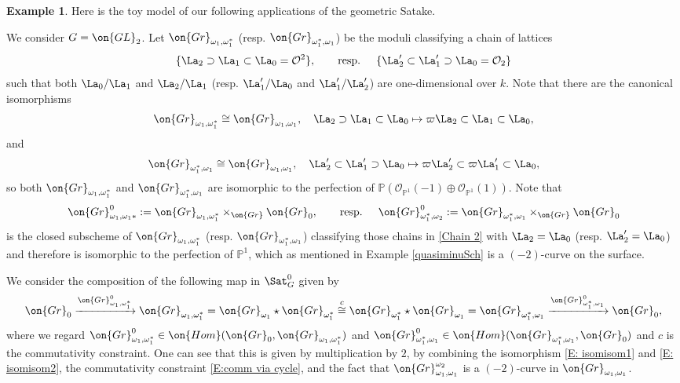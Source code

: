 \documentclass[11pt]{amsart}
\theoremstyle{definition}
\theoremstyle{definition}
\newtheorem{ex}[thm]{Example}
\theoremstyle{definition}
\numberwithin{equation}{subsection}
\newcommand{\bP}{{\mathbb P}}
\newcommand{\mO}{{\mathcal O}}
\newcommand{\Gr}{{\on{Gr}}}
\newcommand{\Hom}{{\on{Hom}}}
\newcommand{\GL}{{\on{GL}}}
\begin{document}
\begin{ex}\label{intersection by geom Sat}
Here is the toy model of our following applications of the geometric Satake. 

We consider $G=\GL_2$. Let $\Gr_{\omega_1,\omega_1^*}$ (resp. $\Gr_{\omega_1^*,\omega_1}$) be the moduli classifying a chain of lattices
\begin{equation}\label{Chain 2}
\{\La_2\supset\La_1\subset \La_0=\mO^2\}, \quad \quad \mbox{resp. } \quad \{\La'_2\subset \La'_1\supset \La_0=\mO_2\}
\end{equation}
such that both $\La_0/\La_{1}$ and $\La_2/\La_1$ (resp. $\La'_1/\La_0$ and $\La'_1/\La'_2$) are one-dimensional over $k$.
Note that there are the canonical isomorphisms 
\begin{equation}
\label{E: isomisom1}
\Gr_{\omega_1,\omega_1^*}\cong\Gr_{\omega_1,\omega_1}, \quad \La_2\supset\La_1\subset \La_0\mapsto \varpi\La_2\subset\La_1\subset\La_0,
\end{equation}
and
\begin{equation}
\label{E: isomisom2}
\Gr_{\omega_1^*,\omega_1}\cong\Gr_{\omega_1,\omega_1}, \quad \La'_2\subset\La'_1\supset \La_0\mapsto \varpi\La'_2\subset\varpi\La'_1\subset\La_0,
\end{equation}
so both $\Gr_{\omega_1,\omega_1^*}$ and $\Gr_{\omega_1^*,\omega_1}$ are isomorphic to the perfection of $\bP(\mO_{\bP^1}(-1)\oplus\mO_{\bP^1}(1))$. Note that 
$$\Gr_{\omega_1,\omega_1*}^0:=\Gr_{\omega_1,\omega_1^*}\times_{\Gr}\Gr_0,\quad\quad \mbox{resp. }\quad\Gr_{\omega_1^*,\omega_2}^0:=\Gr_{\omega_1^*,\omega_1}\times_{\Gr}\Gr_0$$
is the closed subscheme of $\Gr_{\omega_1,\omega_1^*}$ (resp. $\Gr_{\omega_1^*,\omega_1}$) classifying those chains in \eqref{Chain 2} with $\La_2=\La_0$ (resp. $\La'_2=\La_0$) and therefore is isomorphic to the perfection of $\bP^1$, which as mentioned in Example \ref{quasiminuSch} is a $(-2)$-curve on the surface. 

We consider the composition of the following map in $\Sat_G^{0}$ given by
\[\Gr_0\xrightarrow{\Gr_{\omega_1,\omega_1^*}^0} \Gr_{\omega_1,\omega_1^*}=\Gr_{\omega_1}\star\Gr_{\omega_1^*}\stackrel{c}{\cong}\Gr_{\omega_1^*}\star\Gr_{\omega_1}=\Gr_{\omega_1^*,\omega_1}\xrightarrow{\Gr_{\omega_1^*,\omega_1}^0}\Gr_0,\]
where we regard $\Gr_{\omega_1,\omega_1^*}^0\in \Hom(\Gr_0, \Gr_{\omega_1,\omega_1^*})$ and $\Gr_{\omega_1^*,\omega_1}^0\in \Hom(\Gr_{\omega_1^*,\omega_1},\Gr_0)$ and $c$ is the commutativity constraint. One can see that this is given by multiplication by $2$, by combining the isomorphism \eqref{E: isomisom1} and \eqref{E: isomisom2}, the commutativity constraint \eqref{E:comm via cycle}, and the fact that $\Gr_{\omega_1,\omega_1}^{\omega_2}$ is a $(-2)$-curve in $\Gr_{\omega_1,\omega_1}$. 


\end{ex}
\end{document}

